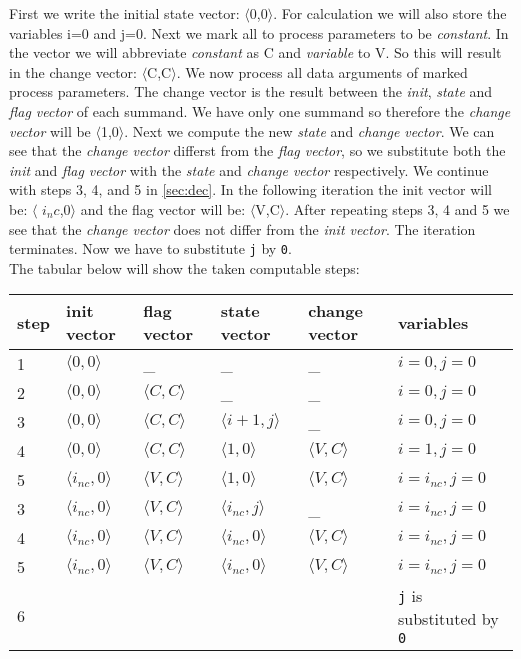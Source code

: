 \documentclass[a4paper,9pt]{article}
\begin{document}
First we write the initial state vector: $\langle$0,0$\rangle$. For calculation we will also store the variables i=0 and j=0.
Next we mark all to process parameters to be \textit{constant}. In the vector we will abbreviate \textit{constant} as  C and \textit{variable} to V. So this will result in the change vector: $\langle$C,C$\rangle$.
We now process all data arguments of marked process parameters. The change vector is the result between the \textit{init}, \textit{state} and \textit{flag vector} of each summand. We have only one summand so therefore the \textit{change vector} will be
$\langle$1,0$\rangle$. 
Next we compute the new \textit{state} and \textit{change vector}. We can see that the \textit{change vector} differst from the \textit{flag vector}, so we substitute both the \textit{init} and \textit{flag vector} with the \textit{state} and \textit{change vector} respectively. We continue with steps 3, 4, and 5 in \ref{sec:dec}. In the following iteration the init vector will be: $\langle$ $i_nc$,0$\rangle$ and the flag vector will be: $\langle$V,C$\rangle$. After repeating steps 3, 4 and 5 we see that the \textit{change vector} does not differ from the \textit{init vector}. The iteration terminates. Now we have to substitute \verb"j" by \verb"0".\\

The tabular below will show the taken computable steps: \\
\begin{tabular}{|l|l|l|l|l|l|}
\hline
step 	&  init vector 			& flag vector			& state vector 			& change vector 		& variables \\
\hline	
\hline
1 	&  $\langle 0,0 \rangle$ 	& \_				& \_				& \_				& $i=0, j=0 $ \\
\hline
2	&  $\langle 0,0 \rangle$ 	&  $\langle C,C \rangle$ 	& \_				& \_				& $i=0, j=0 $\\
\hline
3	&  $\langle 0,0 \rangle$ 	&  $\langle C,C \rangle$ 	&  $\langle i+1,j \rangle$ 	& \_				& $i=0, j=0 $\\
\hline
4	&  $\langle 0,0 \rangle$ 	&  $\langle C,C \rangle$ 	&  $\langle 1,0 \rangle$ 	&  $\langle V,C \rangle$ 	& $i=1, j=0 $\\
\hline
5	&  $\langle i_{nc},0 \rangle$ 	&  $\langle V,C \rangle$ 	&  $\langle 1,0 \rangle$ 	&  $\langle V,C \rangle$ 	& $i= i_{nc} , j=0$ \\
\hline
3	&  $\langle   i_{nc} ,0 \rangle$ 	&  $\langle V,C \rangle$ 	&  $\langle   i_{nc} ,j \rangle$ 	&  \_			 	& $i= i_{nc} , j=0$ \\
\hline
4	&  $\langle   i_{nc} ,0 \rangle$ 	&  $\langle V,C \rangle$ 	&  $\langle   i_{nc} ,0 \rangle$ 	&  $\langle V,C \rangle$ 	& $i= i_{nc} , j=0 $\\
\hline
5	&  $\langle   i_{nc} ,0 \rangle$ 	&  $\langle V,C \rangle$ 	&  $\langle   i_{nc} ,0 \rangle$ 	&  $\langle V,C \rangle$ 	& $i= i_{nc} , j=0 $\\
\hline
6	& 				&				&				&				& \verb"j" is substituted by \verb"0"\\	
\hline
\end{tabular}\\
\end{document}
